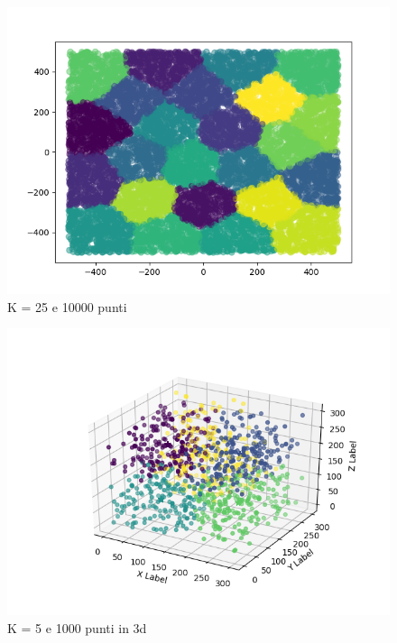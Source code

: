 \documentclass[10pt,twocolumn,letterpaper]{article}
\begin{document}
    \begin{figure}
        \centering
        \includegraphics[width=\linewidth]{../img/2d2.png}
        \caption{K = 25 e 10000 punti}
        \label{fig:fig2}
    \end{figure}

    \begin{figure}
        \centering
        \includegraphics[width=\linewidth]{../img/3d.png}
        \caption{K = 5 e 1000 punti in 3d}
        \label{fig:fig3}
    \end{figure}
\end{document}
